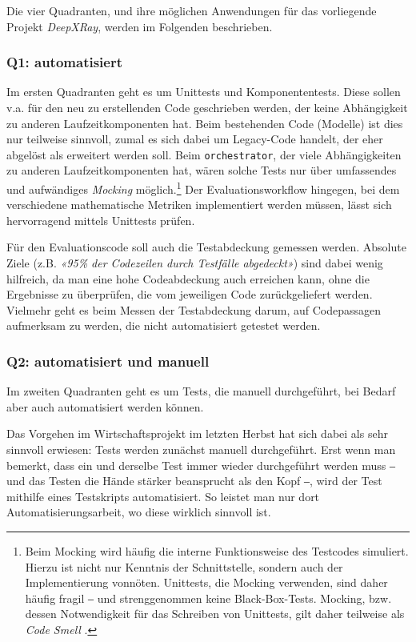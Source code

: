 Die vier Quadranten, und ihre möglichen Anwendungen für das vorliegende Projekt \textit{DeepXRay}, werden im Folgenden beschrieben.

\subsubsection{Q1: automatisiert}

Im ersten Quadranten geht es um Unittests und Komponententests. Diese sollen v.a. für den neu zu erstellenden Code geschrieben werden, der keine Abhängigkeit zu anderen Laufzeitkomponenten hat. Beim bestehenden Code (Modelle) ist dies nur teilweise sinnvoll, zumal es sich dabei um Legacy-Code handelt, der eher abgelöst als erweitert werden soll. Beim \texttt{orchestrator}, der viele Abhängigkeiten zu anderen Laufzeitkomponenten hat, wären solche Tests nur über umfassendes und aufwändiges \textit{Mocking} möglich.\footnote{Beim Mocking wird häufig die interne Funktionsweise des Testcodes simuliert. Hierzu ist nicht nur Kenntnis der Schnittstelle, sondern auch der Implementierung vonnöten. Unittests, die Mocking verwenden, sind daher häufig fragil ‒ und strenggenommen keine Black-Box-Tests. Mocking, bzw. dessen Notwendigkeit für das Schreiben von Unittests, gilt daher teilweise als \textit{Code Smell} \cite[S. 214]{composing-software}.} Der Evaluationsworkflow hingegen, bei dem verschiedene mathematische Metriken implementiert werden müssen, lässt sich hervorragend mittels Unittests prüfen.

Für den Evaluationscode soll auch die Testabdeckung gemessen werden. Absolute Ziele (z.B. \textit{«95\% der Codezeilen durch Testfälle abgedeckt»}) sind dabei wenig hilfreich, da man eine hohe Codeabdeckung auch erreichen kann, ohne die Ergebnisse zu überprüfen, die vom jeweiligen Code zurückgeliefert werden. Vielmehr geht es beim Messen der Testabdeckung darum, auf Codepassagen aufmerksam zu werden, die nicht automatisiert getestet werden.

\subsubsection{Q2: automatisiert und manuell}

Im zweiten Quadranten geht es um Tests, die manuell durchgeführt, bei Bedarf aber auch automatisiert werden können.

Das Vorgehen im Wirtschaftsprojekt im letzten Herbst hat sich dabei als sehr sinnvoll erwiesen: Tests werden zunächst manuell durchgeführt. Erst wenn man bemerkt, dass ein und derselbe Test immer wieder durchgeführt werden muss ‒ und das Testen die Hände stärker beansprucht als den Kopf ‒, wird der Test mithilfe eines Testskripts automatisiert. So leistet man nur dort Automatisierungsarbeit, wo diese wirklich sinnvoll ist.

